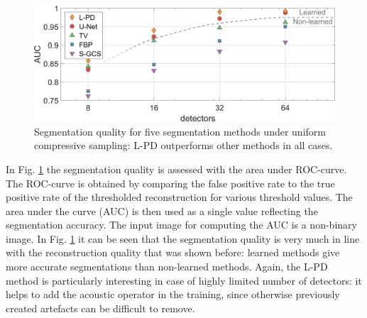\documentclass[journal]{IEEEtran}
\newcommand{\hl}[1]{\cbcolor{red}\begin{changebar}{\color{red} #1}\end{changebar}}
\begin{document}
\hl{
\begin{figure}[ht!]
\centering
\includegraphics[width=\linewidth]{images/Paper_resultsuniform_AUC.png}
\caption{Segmentation quality for five segmentation methods under uniform compressive sampling: L-PD outperforms other methods in all cases.}
\label{fig:AUC_recon}
\end{figure}
}

In Fig. \ref{fig:AUC_recon} the segmentation quality is assessed with the area under ROC-curve. The ROC-curve is obtained by comparing the false positive rate to the true positive rate of the thresholded reconstruction for various threshold values. The area under the curve (AUC) is then used as a single value reflecting the segmentation accuracy. The input image for computing the AUC is a non-binary image. In Fig. \ref{fig:AUC_recon} it can be seen that the segmentation quality is very much in line with the reconstruction quality that was shown before: learned methods give more accurate segmentations than non-learned methods. Again, the L-PD method is particularly interesting in case of highly limited number of detectors: it helps to add the acoustic operator in the training, since otherwise previously created artefacts can be difficult to remove.
\end{document}
